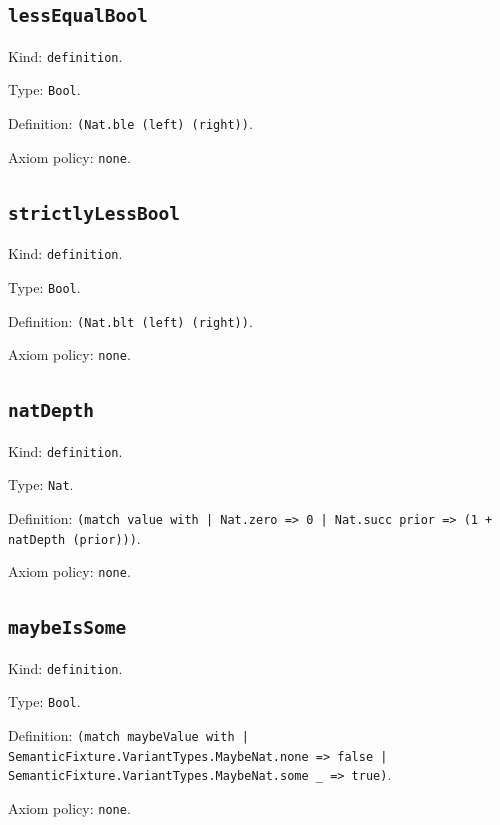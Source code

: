 \documentclass[11pt]{article}
\begin{document}
\subsection*{\texttt{lessEqualBool}}
\noindent Kind: \texttt{definition}.\par
\noindent Type: \texttt{Bool}.\par
\noindent Definition: \texttt{(Nat.ble (left) (right))}.\par
\noindent Axiom policy: \texttt{none}.\par
\subsection*{\texttt{strictlyLessBool}}
\noindent Kind: \texttt{definition}.\par
\noindent Type: \texttt{Bool}.\par
\noindent Definition: \texttt{(Nat.blt (left) (right))}.\par
\noindent Axiom policy: \texttt{none}.\par
\subsection*{\texttt{natDepth}}
\noindent Kind: \texttt{definition}.\par
\noindent Type: \texttt{Nat}.\par
\noindent Definition: \texttt{(match value with | Nat.zero => 0 | Nat.succ prior => (1 + natDepth (prior)))}.\par
\noindent Axiom policy: \texttt{none}.\par
\subsection*{\texttt{maybeIsSome}}
\noindent Kind: \texttt{definition}.\par
\noindent Type: \texttt{Bool}.\par
\noindent Definition: \texttt{(match maybeValue with | SemanticFixture.VariantTypes.MaybeNat.none => false | SemanticFixture.VariantTypes.MaybeNat.some \_ => true)}.\par
\noindent Axiom policy: \texttt{none}.\par
\end{document}
